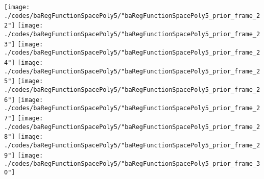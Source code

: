 \begin{frame}{\insertsection}
\begin{center}
{\begin{animateinline}{15}
				 \texttt{[image: ./codes/baRegFunctionSpacePoly5/"baRegFunctionSpacePoly5\_prior\_frame\_22"]}\newframe
				 \texttt{[image: ./codes/baRegFunctionSpacePoly5/"baRegFunctionSpacePoly5\_prior\_frame\_23"]}\newframe
				 \texttt{[image: ./codes/baRegFunctionSpacePoly5/"baRegFunctionSpacePoly5\_prior\_frame\_24"]}\newframe
				 \texttt{[image: ./codes/baRegFunctionSpacePoly5/"baRegFunctionSpacePoly5\_prior\_frame\_25"]}\newframe
				 \texttt{[image: ./codes/baRegFunctionSpacePoly5/"baRegFunctionSpacePoly5\_prior\_frame\_26"]}\newframe
				 \texttt{[image: ./codes/baRegFunctionSpacePoly5/"baRegFunctionSpacePoly5\_prior\_frame\_27"]}\newframe
				 \texttt{[image: ./codes/baRegFunctionSpacePoly5/"baRegFunctionSpacePoly5\_prior\_frame\_28"]}\newframe
				 \texttt{[image: ./codes/baRegFunctionSpacePoly5/"baRegFunctionSpacePoly5\_prior\_frame\_29"]}\newframe
				 \texttt{[image: ./codes/baRegFunctionSpacePoly5/"baRegFunctionSpacePoly5\_prior\_frame\_30"]}
			 \end{animateinline}
			}
	\end{center}
    
\end{frame}


